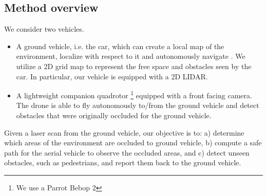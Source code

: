 
\subsection{Method overview}

We consider two vehicles.
\begin{itemize}
\item
A ground vehicle, i.e. the car, which can create a local map of the environment, localize with respect to it and autonomously navigate \cite{Add citation to Felix's IV paper}. We utilize a 2D grid map to represent the free space and obstacles seen by the car. In particular, our vehicle is equipped with a 2D LIDAR. 
\item
A lightweight companion quadrotor \footnote{We use a Parrot Bebop 2} equipped with a front facing camera. The drone is able to fly autonomously to/from the ground vehicle and detect obstacles that were originally occluded for the ground vehicle.
\end{itemize}

Given a laser scan from the ground vehicle, our objective is to:
a) determine which areas of the environment are occluded to ground vehicle,
b) compute a safe path for the aerial vehicle to observe the occluded areas, and
c) detect unseen obstacles, such as pedestrians, and report them back to the ground vehicle.


%
%
%

